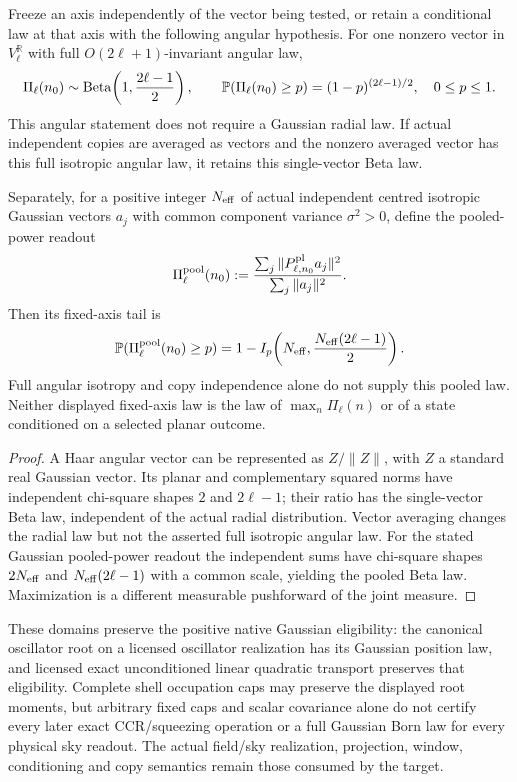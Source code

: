 \documentclass[12pt,a4paper]{article}
\begin{document}
\begin{corollary}
\label{p8:cor:finite-planarity-tail}
Freeze an axis independently of the vector being tested, or retain a
conditional law at that axis with the following angular hypothesis.
For one nonzero vector in $V_\ell^{\mathbb R}$ with full
$O(2\ell+1)$-invariant angular law,
\[
 \Pi_\ell(n_0)\sim {\rm Beta}\!\left(1,\frac{2\ell-1}{2}\right),
 \qquad
 \mathbb P(\Pi_\ell(n_0)\ge p)=(1-p)^{(2\ell-1)/2},
 \quad 0\le p\le1.
\]
This angular statement does not require a Gaussian radial law.  If actual
independent copies are averaged as vectors and the nonzero averaged vector
has this full isotropic angular law, it retains this single-vector Beta law.

Separately, for a positive integer $N_{\rm eff}$ of actual independent centred
isotropic Gaussian vectors $a_j$ with common component variance
$\sigma^2>0$, define the pooled-power
readout
\[
 \Pi_\ell^{\rm pool}(n_0)
 :=\frac{\sum_j\|P_{\ell,n_0}^{\rm pl}a_j\|^2}
         {\sum_j\|a_j\|^2}.
\]
Then its fixed-axis tail is
\begin{equation}
\label{p8:eq:finite-planarity-tail}
 \mathbb P(\Pi_\ell^{\rm pool}(n_0)\ge p)
 =1-I_p\!\left(N_{\rm eff},\frac{N_{\rm eff}(2\ell-1)}2\right).
\end{equation}
Full angular isotropy and copy independence alone do not supply this pooled
law.  Neither displayed fixed-axis law is the law of
$\max_n\Pi_\ell(n)$ or of a state conditioned on a selected planar outcome.
\end{corollary}
\begin{proof}
A Haar angular vector can be represented as $Z/\|Z\|$, with $Z$ a standard
real Gaussian vector.  Its planar and complementary squared norms have
independent chi-square shapes $2$ and $2\ell-1$; their ratio has the
single-vector Beta law, independent of the actual radial distribution.
Vector averaging changes the radial law but not the asserted full isotropic
angular law.  For the stated Gaussian pooled-power readout the independent
sums have chi-square shapes $2N_{\rm eff}$ and
$N_{\rm eff}(2\ell-1)$ with a common scale, yielding the pooled Beta law.
Maximization is a different measurable pushforward of the joint measure.
\end{proof}

These domains preserve the positive native Gaussian eligibility: the
canonical oscillator root on a licensed oscillator realization has its
Gaussian position law, and licensed exact unconditioned linear quadratic
transport preserves that eligibility.  Complete shell occupation caps may
preserve the displayed root moments, but arbitrary fixed caps and scalar
covariance alone do not certify every later exact CCR/squeezing operation or
a full Gaussian Born law for every physical sky readout.  The actual
field/sky realization, projection, window, conditioning and copy semantics
remain those consumed by the target.
\end{document}

